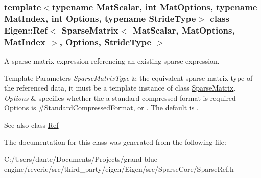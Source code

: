 \subsubsection*{template$<$typename Mat\+Scalar, int Mat\+Options, typename Mat\+Index, int Options, typename Stride\+Type$>$\newline
class Eigen\+::\+Ref$<$ Sparse\+Matrix$<$ Mat\+Scalar, Mat\+Options, Mat\+Index $>$, Options, Stride\+Type $>$}

A sparse matrix expression referencing an existing sparse expression. 


\begin{DoxyTemplParams}{Template Parameters}
{\em Sparse\+Matrix\+Type} & the equivalent sparse matrix type of the referenced data, it must be a template instance of class \mbox{\hyperlink{class_eigen_1_1_sparse_matrix}{Sparse\+Matrix}}. \\
\hline
{\em Options} & specifies whether the a standard compressed format is required {\ttfamily Options} is {\ttfamily \#\+Standard\+Compressed\+Format}, or {}. The default is {}.\\
\hline
\end{DoxyTemplParams}
\begin{DoxySeeAlso}{See also}
class \mbox{\hyperlink{class_eigen_1_1_ref}{Ref}} 
\end{DoxySeeAlso}


The documentation for this class was generated from the following file\+:\begin{DoxyCompactItemize}
\item 
C\+:/\+Users/dante/\+Documents/\+Projects/grand-\/blue-\/engine/reverie/src/third\+\_\+party/eigen/\+Eigen/src/\+Sparse\+Core/Sparse\+Ref.\+h\end{DoxyCompactItemize}
